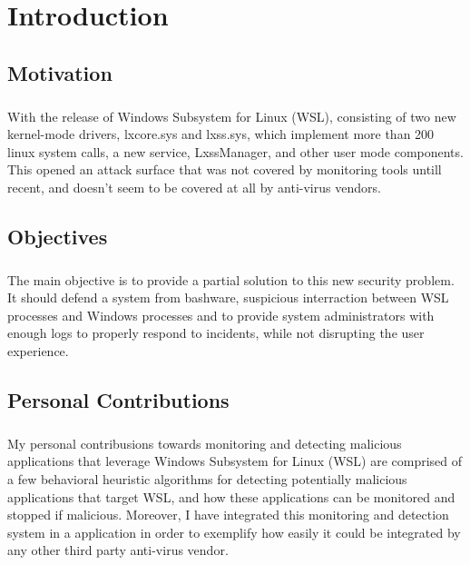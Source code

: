 \chapter{Introduction}
    \section{Motivation}
        \paragraph{} With the release of Windows Subsystem for Linux (WSL), consisting of two new kernel-mode drivers, lxcore.sys and lxss.sys,
        which implement more than  200 linux system calls, a new service, LxssManager, and other user mode components. This opened an attack
        surface that was not covered by monitoring tools untill recent, and doesn't seem to be covered at all by anti-virus vendors.

    \section{Objectives}
        \paragraph{} The main objective is to provide a partial solution to this new security problem. It should defend a system from bashware,
        suspicious interraction between WSL processes and Windows processes and to provide system administrators with enough logs to properly
        respond to incidents, while not disrupting the user experience.

    \section{Personal Contributions}
        \paragraph{}
        My personal contribusions towards monitoring and detecting malicious applications that leverage Windows Subsystem for Linux (WSL) are
        comprised of a few behavioral heuristic algorithms for detecting potentially malicious applications that target WSL, and how these
        applications can be monitored and stopped if malicious. Moreover, I have integrated this monitoring and detection system in a application
        in order to exemplify how easily it could be integrated by any other third party anti-virus vendor.
        
